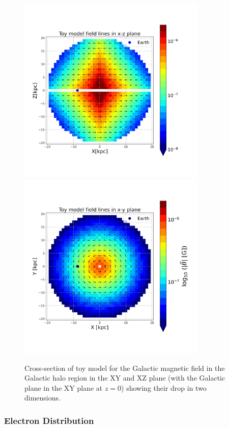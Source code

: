 \documentclass[12pt, a4 paper]{mnras}
\begin{document}
\begin{figure}
    \centering
    \includegraphics[width = 9cm]{Images/ToyModel_BestFit_XZ.png}%
    \includegraphics[width = 9cm
    ]{Images/ToyModel_BestFit_XY.png}
    \caption{Cross-section of toy model for the Galactic magnetic field in the Galactic halo region in the XY and XZ plane (with the Galactic plane in the XY plane at $z=0$) showing their drop in two dimensions.}
    \label{fig:Vis_TM}
\end{figure}

\subsubsection{Electron Distribution}
\end{document}
